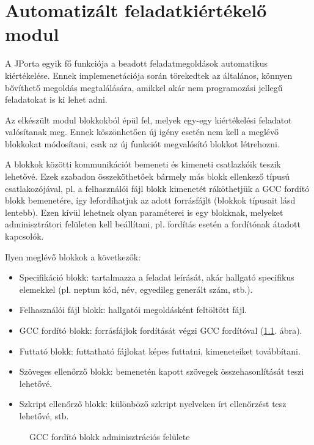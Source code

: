 \chapter{Automatizált feladatkiértékelő modul}\label{chapter:exercise}

A JPorta egyik fő funkciója a beadott feladatmegoldások automatikus kiértékelése. Ennek implemenetációja során törekedtek az általános, könnyen bővíthető megoldás megtalálására, amikkel akár nem programozási jellegű feladatokat is ki lehet adni. \cite{DudiMsc}

Az elkészült modul blokkokból épül fel, melyek egy-egy kiértékelési feladatot valósítanak meg. Ennek köszönhetően új igény esetén nem kell a meglévő blokkokat módosítani, csak az új funkciót megvalósító blokkot létrehozni.

A blokkok közötti kommunikációt bemeneti és kimeneti csatlazkóik teszik lehetővé. Ezek szabadon összeköthetőek bármely más blokk ellenkező típusú csatlakozójával, pl. a felhasználói fájl blokk kimenetét ráköthetjük a GCC fordító blokk bemenetére, így lefordíhatjuk az adott forrásfájlt (blokkok típusait lásd lentebb). Ezen kívül lehetnek olyan paraméterei is egy blokknak, melyeket adminisztrátori felületen kell beállítani, pl. fordítás esetén a fordítónak átadott kapcsolók.

Ilyen meglévő blokkok a következők:

\begin{itemize}
    \item Specifikáció blokk: tartalmazza a feladat leírását, akár hallgató specifikus elemekkel (pl. neptun kód, név, egyedileg generált szám, stb.). 
    \item Felhasználói fájl blokk: hallgatói megoldásként feltöltött fájl.
    \item GCC fordító blokk: forrásfájlok fordítását végzi GCC fordítóval (\ref{fig:exercise_blokk}. ábra).
    \item Futtató blokk: futtatható fájlokat képes futtatni, kimeneteiket továbbítani.
    \item Szöveges ellenőrző blokk: bemenetén kapott szövegek összehasonlítását teszi lehetővé.
    \item Szkript ellenőrző blokk: különböző szkript nyelveken írt ellenőrzést tesz lehetővé, stb.
\end{itemize} 

\begin{figure}[p]
    \centering
    \caption{GCC fordító blokk adminisztrációs felülete}
    \label{fig:exercise_blokk}
\end{figure}


